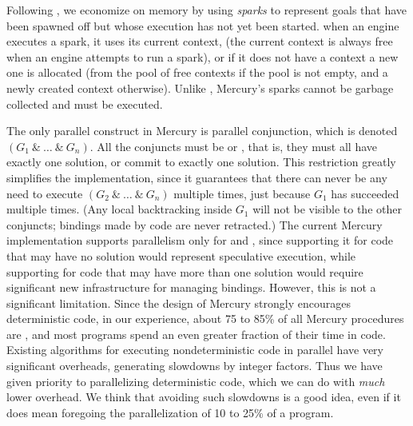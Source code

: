 Following \citet{simonmar_2009_multicore_rts},
we economize on memory by using \emph{sparks}
to represent goals that have been spawned off
but whose execution has not yet been started.
when an engine executes a spark, it uses its current context,
(the current context is always free when an engine attempts to run a spark),
or if it does not have a context a new one is allocated
(from the pool of free contexts if the pool is not empty,
and a newly created context otherwise).
Unlike \cite{simonmar_2009_multicore_rts},
Mercury's sparks cannot be garbage collected and must be executed.

The only parallel construct in Mercury is parallel conjunction,
which is denoted $(G_1~\&~\ldots~\&~G_n)$.
All the conjuncts must be \ddet or \dccmulti,
that is, they must all have exactly one solution,
or commit to exactly one solution.
This restriction greatly simplifies the implementation,
since it guarantees that there can never be any need
to execute $(G_2~\&~\ldots~\&~G_n)$ multiple times,
just because $G_1$ has succeeded multiple times.
(Any local backtracking inside $G_1$ will not be visible to the other conjuncts;
bindings made by \ddet code are never retracted.)
The current Mercury implementation supports parallelism only for \ddet and \dccmulti,
since supporting it for code that may have no solution
would represent speculative execution,
while supporting for code that may have more than one solution
would require significant new infrastructure for managing bindings.
However, this is not a significant limitation.
Since the design of Mercury strongly encourages deterministic code,
in our experience, about 75 to 85\% of all Mercury procedures are \ddet,
and most programs spend an even greater fraction of their time in \ddet code.
Existing algorithms for executing nondeterministic code in parallel
have very significant overheads, generating slowdowns by integer factors.
Thus we have given priority to parallelizing deterministic code,
which we can do with \emph{much} lower overhead.
We think that avoiding such slowdowns is a good idea,
even if it does mean foregoing the parallelization of 10 to 25\% of a program.

